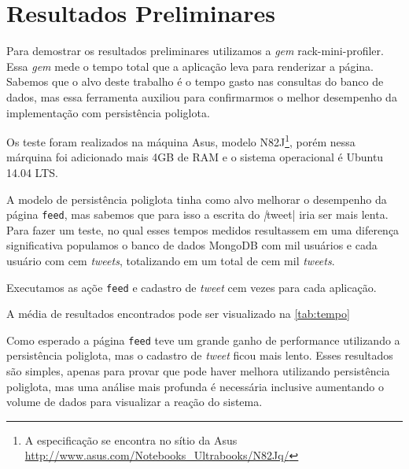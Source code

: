 \chapter{Resultados Preliminares}
\label{chap:resultados}

Para demostrar os resultados preliminares utilizamos a \textit{gem} rack-mini-profiler. Essa \textit{gem} mede o tempo total que a aplicação leva para renderizar a página. Sabemos que o alvo deste trabalho é o tempo gasto nas consultas do banco de dados, mas essa ferramenta auxiliou para confirmarmos o melhor desempenho da implementação com persistência poliglota.

Os teste foram realizados na máquina Asus, modelo N82J\footnote{A especificação se encontra no sítio da Asus \url{http://www.asus.com/Notebooks_Ultrabooks/N82Jq/}}, porém nessa márquina foi adicionado mais 4GB de RAM e o sistema operacional é Ubuntu 14.04 LTS.

A modelo de persistência poliglota tinha como alvo melhorar o desempenho da página \verb|feed|, mas sabemos que para isso a escrita do \textit|tweet| iria ser mais lenta. Para fazer um teste, no qual esses tempos medidos resultassem em uma diferença significativa populamos o banco de dados MongoDB com mil usuários e cada usuário com cem \textit{tweets}, totalizando em um total de cem mil \textit{tweets}.

Executamos as açõe \verb|feed| e cadastro de \textit{tweet} cem vezes para cada aplicação.

A média de resultados encontrados pode ser visualizado na \autoref{tab:tempo}


Como esperado a página \verb|feed| teve um grande ganho de performance utilizando a persistência poliglota, mas o cadastro de \textit{tweet} ficou mais lento. Esses resultados são simples, apenas para provar que pode haver melhora utilizando persistência poliglota, mas uma análise mais profunda é necessária inclusive aumentando o volume de dados para visualizar a reação do sistema.